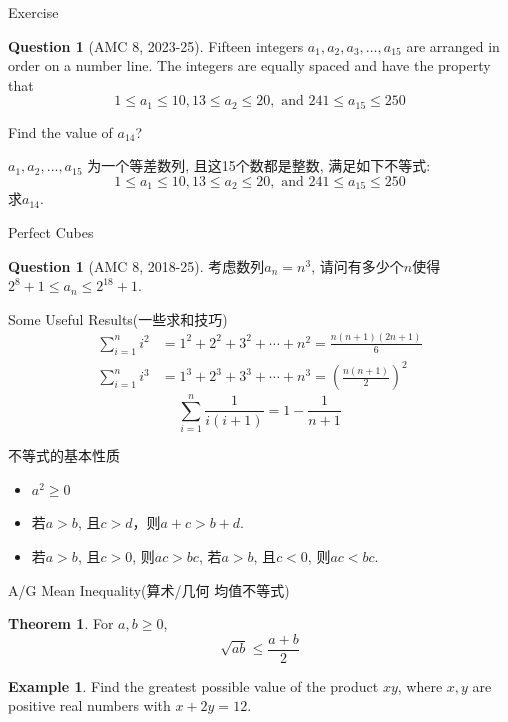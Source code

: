 \documentclass{beamer}
\theoremstyle{definition}
\newtheorem{theo}[defn]{Theorem}
\newtheorem{exam}[defn]{Example}
\newtheorem{ques}[defn]{Question}
\begin{document}
\begin{frame}{Exercise}
    \begin{ques}[AMC 8, 2023-25]
        Fifteen integers $a_1, a_2, a_3, \ldots, a_{15}$ are arranged in order on a number line. The integers are equally spaced and have the property that
        $$
            1 \leq a_1 \leq 10,13 \leq a_2 \leq 20, \text { and } 241 \leq a_{15} \leq 250
        $$

        Find the value of $a_{14}$?

        $a_1,a_2,\dots,a_{15}$ 为一个等差数列, 且这15个数都是整数, 满足如下不等式:
        $$
            1 \leq a_1 \leq 10,13 \leq a_2 \leq 20, \text { and } 241 \leq a_{15} \leq 250
        $$
        求$a_{14}$.
    \end{ques}
\end{frame}
\begin{frame}{Perfect Cubes}
\begin{ques}[AMC 8, 2018-25]
    考虑数列$a_n=n^3$, 请问有多少个$n$使得$2^8+1\le a_n\le 2^{18}+1$.
\end{ques}
\end{frame}
\begin{frame}{Some Useful Results(一些求和技巧)}
    \begin{align*}
        \sum_{i=1}^n i^2 & =1^2+2^2+3^2+\cdots+n^2=\frac{n(n+1)(2 n+1)}{6}         \\
        \sum_{i=1}^n i^3 & =1^3+2^3+3^3+\cdots+n^3=\left(\frac{n(n+1)}{2}\right)^2
    \end{align*}
    \begin{equation*}
        \sum_{i=1}^n \frac{1}{i(i+1)}=1-\frac{1}{n+1}
    \end{equation*}
\end{frame}
\begin{frame}{不等式的基本性质}
    \begin{itemize}
        \item $a^2\ge 0$
        \item 若$a>b$, 且$c>d$，则$a+c>b+d$.
        \item 若$a>b$, 且$c>0$, 则$ac>bc$, 若$a>b$, 且$c<0$, 则$ac<bc$.
    \end{itemize}
\end{frame}
\begin{frame}{A/G Mean Inequality(算术/几何 均值不等式)}
    \begin{theo}
       For $a,b\ge 0$, 
       \begin{equation*}
          \sqrt{ab}\le \frac{a+b}{2}
       \end{equation*}
    \end{theo}
    \begin{exam}
        Find the greatest possible value of the product $xy$, where $x,y$ are positive real numbers with $x+2y=12$.
    \end{exam}
\end{frame}
\end{document}

